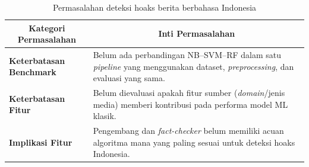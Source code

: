 \begin{table}[h!]
    \begin{tabular}{ | p{3.5cm} | p{8.5cm} | }
    \hline
    \multicolumn{1}{|c|}{\textbf{Kategori Permasalahan}} 
    & \multicolumn{1}{c|}{\textbf{Inti Permasalahan}} \\
    
    \hline
    \textbf{Keterbatasan Benchmark} 
    & Belum ada perbandingan NB–SVM–RF dalam satu \textit{pipeline} yang menggunakan dataset, \textit{preprocessing}, dan evaluasi yang sama.  \\

    \hline
    \textbf{Keterbatasan Fitur} 
    & Belum dievaluasi apakah fitur sumber (\textit{domain}/jenis media) memberi kontribusi pada performa model ML klasik. \\

    \hline
    \textbf{Implikasi Fitur} 
    & Pengembang dan \textit{fact-checker} belum memiliki acuan algoritma mana yang paling sesuai untuk deteksi hoaks Indonesia. \\
    \hline
    \end{tabular}
\caption{Permasalahan deteksi hoaks berita berbahasa Indonesia}
\label{tbl:permasalahan deteksi hoaks}
\end{table}